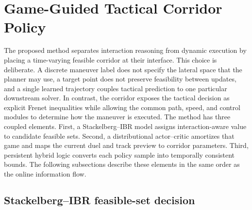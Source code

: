 
\section{Game-Guided Tactical Corridor Policy}\label{sec:tactical}

The proposed method separates interaction reasoning from dynamic execution by
placing a time-varying feasible corridor at their interface.  This choice is
deliberate.  A discrete maneuver label does not specify the lateral space that
the planner may use, a target point does not preserve feasibility between
updates, and a single learned trajectory couples tactical prediction to one
particular downstream solver.  In contrast, the corridor exposes the tactical
decision as explicit Frenet inequalities while allowing the common path,
speed, and control modules to determine how the maneuver is executed.  The
method has three coupled elements.  First, a Stackelberg--IBR model assigns
interaction-aware value to candidate feasible sets.  Second, a distributional
actor--critic amortizes that game and maps the current duel and track preview
to corridor parameters.  Third, persistent hybrid logic converts each policy
sample into temporally consistent bounds.  The following subsections describe
these elements in the same order as the online information flow.

\subsection{Stackelberg--IBR feasible-set decision}
\label{subsec:game_formulation}

